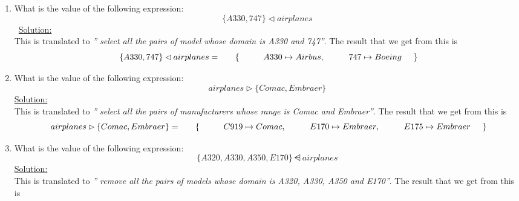 \begin{enumerate}
  \item What is the value of the following expression:
  \[ \{A330, 747\}  \lhd airplanes \]\
  \noindent\underline{Solution:}\\ This is translated to \emph{'' select all the pairs of model whose domain is A330 and 747''}. The result that we get from this is\\
  
  \[
\ {\{A330, 747\}  \lhd airplanes}  = \
\hspace{5mm} \{ \\
\hspace{10mm} A330 \mapsto Airbus,\\
\hspace{10mm} 747 \mapsto Boeing\\
\hspace{5mm} \}
  \]

  \item What is the value of the following expression:
  \[ airplanes \rhd \{ Comac, Embraer \} \]
  \noindent\underline{Solution:}\\This is translated to \emph{'' select all the pairs of manufacturers whose range is Comac and Embraer''}. The result that we get from this is\\
  \[
\ airplanes \rhd \{ Comac, Embraer \}  = \
\hspace{5mm} \{ \\
\hspace{10mm} C919 \mapsto Comac,\\
\hspace{10mm} E170 \mapsto Embraer,\\
\hspace{10mm} E175 \mapsto Embraer\\
\hspace{5mm} \}
  \]
  \item What is the value of the following expression:
  \[ \{A320,A330,A350, E170 \} \ndres airplanes \]
  \noindent\underline{Solution:}\\ This is translated to \emph{'' remove all the pairs of models whose domain is A320, A330, A350 and E170''}. The result that we get from this is\\


\end{enumerate}
